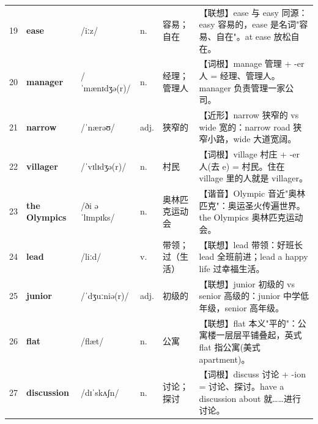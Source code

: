 \documentclass[UTF8,a4paper,11pt,oneside]{ctexbook}
\newcommand{\cellword}[1]{{\bfseries\textcolor{wordcol}{#1}}}
\newcommand{\cellipa}[1]{{\footnotesize\textcolor{ipacol}{#1}}}
\newcommand{\cellpos}[1]{\textcolor{poscol}{#1}}
\newcommand{\cellno}[1]{\textcolor{volcolor!75!black}{#1}}
\begin{document}
{\begin{longtable}{@{}C{0.045\textwidth}L{0.155\textwidth}L{0.175\textwidth}C{0.070\textwidth}L{0.180\textwidth}L{0.282\textwidth}@{}}
 \cellno{19} & \cellword{ease} & \cellipa{/iːz/} & \cellpos{n.} & 容易；自在 & \textcolor{tagAssoc}{【联想】}ease 与 easy 同源：easy 容易的，ease 是名词"容易、自在"。at ease 放松自在。 \\
\cellno{20} & \cellword{manager} & \cellipa{/ˈmænɪdʒə(r)/} & \cellpos{n.} & 经理；管理人 & \textcolor{tagRoot}{【词根】}manage 管理 + -er 人 = 经理、管理人。manager 负责管理一家公司。 \\
 \cellno{21} & \cellword{narrow} & \cellipa{/ˈnærəʊ/} & \cellpos{adj.} & 狭窄的 & \textcolor{tagNear}{【近形】}narrow 狭窄的 vs wide 宽的：narrow road 狭窄小路，wide 大道宽阔。 \\
\cellno{22} & \cellword{villager} & \cellipa{/ˈvɪlɪdʒə(r)/} & \cellpos{n.} & 村民 & \textcolor{tagRoot}{【词根】}village 村庄 + -er 人(去 e) = 村民。住在 village 里的人就是 villager。 \\
 \cellno{23} & \cellword{the Olympics} & \cellipa{/ði əˈlɪmpɪks/} & \cellpos{n.} & 奥林匹克运动会 & \textcolor{tagSound}{【谐音】}Olympic 音近"奥林匹克"：奥运圣火传遍世界。the Olympics 奥林匹克运动会。 \\
\cellno{24} & \cellword{lead} & \cellipa{/liːd/} & \cellpos{v.} & 带领；过（生活） & \textcolor{tagAssoc}{【联想】}lead 带领：好班长 lead 全班前进；lead a happy life 过幸福生活。 \\
 \cellno{25} & \cellword{junior} & \cellipa{/ˈdʒuːniə(r)/} & \cellpos{adj.} & 初级的 & \textcolor{tagAssoc}{【联想】}junior 初级的 vs senior 高级的：junior 中学低年级，senior 高年级。 \\
\cellno{26} & \cellword{flat} & \cellipa{/flæt/} & \cellpos{n.} & 公寓 & \textcolor{tagAssoc}{【联想】}flat 本义"平的"：公寓楼一层层平铺叠起，英式 flat 指公寓(美式 apartment)。 \\
 \cellno{27} & \cellword{discussion} & \cellipa{/dɪˈskʌʃn/} & \cellpos{n.} & 讨论；探讨 & \textcolor{tagRoot}{【词根】}discuss 讨论 + -ion = 讨论、探讨。have a discussion about 就……进行讨论。 \\
\end{longtable}
}

\end{document}

